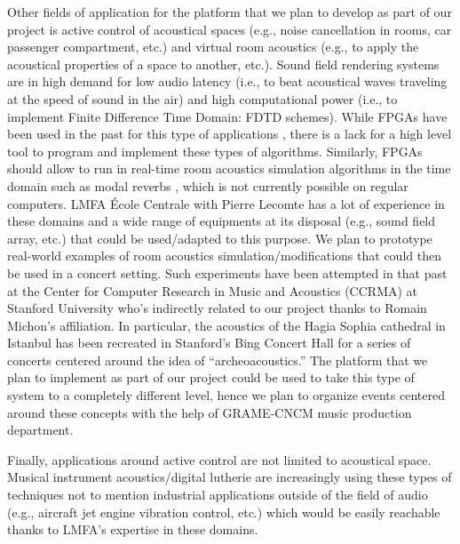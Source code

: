 \documentclass[a4paper,10pt]{article}
\newcommand{\PP}{our project}
\begin{document}
Other fields of application for the platform that we plan to develop as part of \PP{} is active control of acoustical spaces (e.g., noise cancellation in rooms, car passenger compartment, etc.) and virtual room acoustics (e.g., to apply the acoustical properties of a space to another, etc.). Sound field rendering systems are in high demand for low audio latency (i.e., to beat acoustical waves traveling at the speed of sound in the air) and high computational power (i.e., to implement Finite Difference Time Domain: FDTD schemes). While FPGAs have been used in the past for this type of applications \cite{Tan2019}, there is a lack for a high level tool to program and implement these types of algorithms. Similarly, FPGAs should allow to run in real-time room acoustics simulation algorithms in the time domain such as modal reverbs \cite{Abel2019}, which is not currently possible on regular computers. LMFA École Centrale with Pierre Lecomte has a lot of experience in these domains and a wide range of equipments at its disposal (e.g., sound field array, etc.) that could be used/adapted to this purpose. We plan to prototype real-world examples of room acoustics simulation/modifications that could then be used in a concert setting. Such experiments have been attempted in that past at the Center for Computer Research in Music and Acoustics (CCRMA) at Stanford University who's indirectly related to \PP{} thanks to Romain Michon's affiliation. In particular, the acoustics of the Hagia Sophia cathedral in Istanbul has been recreated in Stanford's Bing Concert Hall for a series of concerts centered around the idea of ``archeoacoustics.'' \cite{Abel2009} The platform that we plan to implement as part of \PP{} could be used to take this type of system to a completely different level, hence we plan to organize events centered around these concepts with the help of GRAME-CNCM music production department.

Finally, applications around active control are not limited to acoustical space. Musical instrument acoustics/digital lutherie are increasingly using these types of techniques \cite{Zhang2018} not to mention industrial applications outside of the field of audio (e.g., aircraft jet engine vibration control, etc.) which would be easily reachable thanks to LMFA's expertise in these domains.

\end{document}
